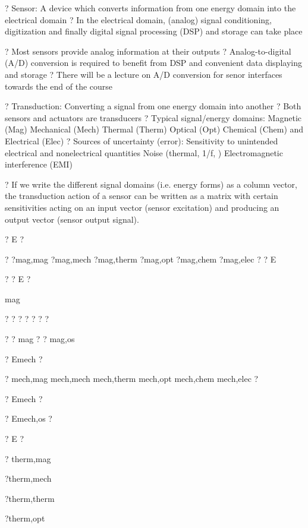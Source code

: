 \documentclass[2pt,landscape]{article}
\begin{document}
\begin{multicols*}{5}
?	Sensor:
A device which converts information from one energy domain into 
the electrical domain
?	In the electrical domain, (analog) signal conditioning, digitization 
and finally digital signal processing (DSP) and storage can take 
place






?	Most sensors provide analog information at their outputs
?	Analog-to-digital (A/D) conversion is required
to benefit from DSP and convenient data displaying 
and storage
?	There will be a lecture on A/D conversion for senor 
interfaces towards the end of the course



?	Transduction:
Converting a signal from one energy domain into another
?	Both sensors and actuators are transducers
?	Typical signal/energy domains:
\textbullet 	Magnetic (Mag)
\textbullet 	Mechanical (Mech)
\textbullet 	Thermal (Therm)
\textbullet 	Optical (Opt)
\textbullet 	Chemical (Chem) and
\textbullet 	Electrical (Elec)
?	Sources of uncertainty (error):
\textbullet 	Sensitivity to unintended electrical and nonelectrical quantities
\textbullet 	Noise (thermal, 1/f, \textbullet )
\textbullet 	Electromagnetic interference (EMI) \textbullet 



?	If we write the different signal domains (i.e. energy forms) as a column 
vector, the transduction action of a sensor can be written as a matrix 
with certain sensitivities acting on an input vector (sensor excitation) 
and producing an output vector (sensor output signal).



? E	?


? ?mag,mag	?mag,mech	?mag,therm	?mag,opt	?mag,chem	?mag,elec ? ? E


?	? E	?


mag


? ?	?	?	?	?	?


? ?	mag ?	?	mag,os


? Emech ?


?	mech,mag	mech,mech	mech,therm	mech,opt	mech,chem	mech,elec ?


? Emech ?


? Emech,os ?


? E	?


?
therm,mag


?therm,mech


?therm,therm


?therm,opt



\end{multicols*}
\end{document}
